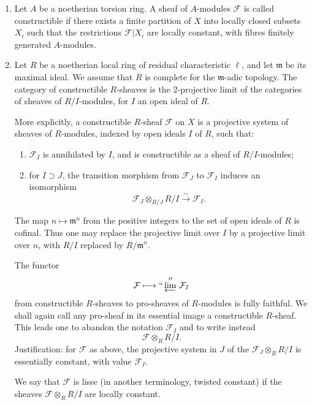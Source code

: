 \documentclass[11pt]{article}
\theoremstyle{remark}
\newcommand{\limproj}{\varprojlim}
\begin{document}
\begin{enumerate}[label=\alph*)]
\item Let $A$ be a noetherian torsion ring. A sheaf of $A$-modules $\mathcal F$ is called constructible if there exists a finite partition of $X$ into locally closed subsets $X_i$ such that the restrictions $\mathcal F|X_i$ are locally constant, with fibres finitely generated $A$-modules.

\item Let $R$ be a noetherian local ring of residual characteristic $\ell$, and let $\mathfrak m$ be its maximal ideal. We assume that $R$ is complete for the $\mathfrak m$-adic topology. The category of constructible $R$-sheaves is the 2-projective limit of the categories of sheaves of $R/I$-modules, for $I$ an open ideal of $R$.

More explicitly, a constructible $R$-sheaf $\mathcal F$ on $X$ is a projective system of sheaves of $R$-modules, indexed by open ideals $I$ of $R$, such that:
\begin{enumerate}[label=(\roman*)]
\item $\mathcal F_I$ is annihilated by $I$, and is constructible as a sheaf of $R/I$-modules;
\item for $I\supset J$, the transition morphism from $\mathcal F_J$ to $\mathcal F_I$ induces an isomorphism
\[
\mathcal F_J\otimes_{R/J} R/I \xrightarrow{\sim} \mathcal F_I.
\]
\end{enumerate}
The map $n\mapsto \mathfrak m^n$ from the positive integers to the set of open ideals of $R$ is cofinal. Thus one may replace the projective limit over $I$ by a projective limit over $n$, with $R/I$ replaced by $R/\mathfrak m^n$.

The functor
\[
\mathcal F\longmapsto ``\limproj''\,\mathcal F_I
\]
from constructible $R$-sheaves to pro-sheaves of $R$-modules is fully faithful. We shall again call any pro-sheaf in its essential image a constructible $R$-sheaf. This leads one to abandon the notation $\mathcal F_I$ and to write instead
\[
\mathcal F\otimes_R R/I.
\]
Justification: for $\mathcal F$ as above, the projective system in $J$ of the $\mathcal F_J\otimes_R R/I$ is essentially constant, with value $\mathcal F_I$.

We say that $\mathcal F$ is lisse (in another terminology, twisted constant) if the sheaves $\mathcal F\otimes_R R/I$ are locally constant.


\end{enumerate}
\end{document}
